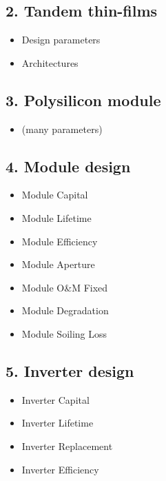 \documentclass[letterpaper,10pt,english]{sphinxmanual}
\begin{document}
\subsection{2. Tandem thin-films}
\label{\detokenize{doc-src/mock-foa:tandem-thin-films}}\begin{itemize}
\item {} 
Design parameters

\item {} 
Architectures

\end{itemize}


\subsection{3. Polysilicon module}
\label{\detokenize{doc-src/mock-foa:polysilicon-module}}\begin{itemize}
\item {} 
(many parameters)

\end{itemize}


\subsection{4. Module design}
\label{\detokenize{doc-src/mock-foa:module-design}}\begin{itemize}
\item {} 
Module Capital

\item {} 
Module Lifetime

\item {} 
Module Efficiency

\item {} 
Module Aperture

\item {} 
Module O\&M Fixed

\item {} 
Module Degradation

\item {} 
Module Soiling Loss

\end{itemize}


\subsection{5. Inverter design}
\label{\detokenize{doc-src/mock-foa:inverter-design}}\begin{itemize}
\item {} 
Inverter Capital

\item {} 
Inverter Lifetime

\item {} 
Inverter Replacement

\item {} 
Inverter Efficiency

\end{itemize}
\end{document}
